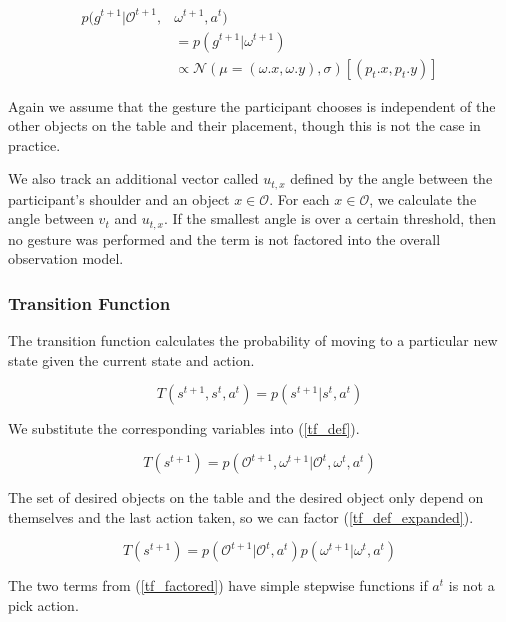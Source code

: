 \documentclass[letterpaper]{article}
\newcommand{\stnote}[1]{\textcolor{blue}{\textbf{ST: #1}}}
\begin{document}
\begin{align}
	p(g^{t+1}|\mathcal{O}^{t+1},&\omega^{t+1},a^t)\\
	&= p(g^{t+1}|\omega^{t+1})  \\
   &\propto \mathcal{N}(\mu = (\omega.x, \omega.y), \sigma)[(p_t.x, p_t.y)]
\end{align}


Again we assume that the gesture the participant chooses is independent of the other objects on the table and their placement, though this is not the case in practice. 


We also track an additional vector called $u_{t,x}$ defined by the angle between the participant's shoulder and an object $x\in \mathcal{O}$. 
For each $x \in \mathcal{O}$, we calculate the angle between $v_t$ and $u_{t,x}$. If the smallest angle is over a certain threshold, then no gesture was performed and the term is not factored into the overall observation model. 



\subsubsection{Transition Function}
The transition function calculates the probability of moving to a particular new state given 
the current state and action.

\begin{equation}\label{tf_def}
T(s^{t+1},s^t,a^t) = p(s^{t+1}|s^t,a^t)
\end{equation}

We substitute the corresponding variables into (\ref{tf_def}).

\begin{equation}\label{tf_def_expanded}
T(s^{t+1}) = p(\mathcal{O}^{t+1},\omega^{t+1}|\mathcal{O}^{t},\omega^{t},a^t)
\end{equation}

The set of desired objects on the table and the desired object only depend on themselves and the last action taken, so we can factor (\ref{tf_def_expanded}).

\begin{equation}\label{tf_factored}
	T(s^{t+1}) = p(\mathcal{O}^{t+1}|\mathcal{O}^{t}, a^t)p(\omega^{t+1}|\omega^{t}, a^t)
\end{equation}

The two terms from (\ref{tf_factored}) have simple stepwise functions if $a^t$ is not a pick action. 
\end{document}
